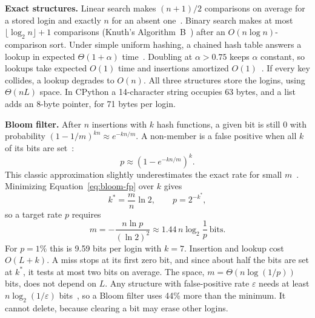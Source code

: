 \documentclass[acmsmall,nonacm]{acmart}
\begin{document}
\textbf{Exact structures.} Linear search makes $(n+1)/2$ comparisons on average
for a stored login and exactly $n$ for an absent one~\cite{knuth1998}. Binary
search makes at most $\lfloor \log_2 n \rfloor + 1$ comparisons (Knuth's
Algorithm~B~\cite{knuth1998}) after an $O(n \log n)$-comparison sort. Under
simple uniform hashing, a chained hash table answers a lookup in expected
$\Theta(1 + \alpha)$ time~\cite[Thms.~11.1--11.2]{cormen2022}. Doubling at
$\alpha > 0.75$ keeps $\alpha$ constant, so lookups take expected $O(1)$ time
and insertions amortized $O(1)$~\cite[\S 16.4]{cormen2022}. If every key
collides, a lookup degrades to $O(n)$. All three structures store the logins,
using $\Theta(nL)$ space. In CPython a 14-character string occupies 63 bytes,
and a list adds an 8-byte pointer, for 71 bytes per login.

\textbf{Bloom filter.} After $n$ insertions with $k$ hash functions, a given bit
is still 0 with probability $(1 - 1/m)^{kn} \approx e^{-kn/m}$. A non-member is
a false positive when all $k$ of its bits are set~\cite{broder2004,mitzenmacher2017}:
\begin{equation}
  p \approx \left(1 - e^{-kn/m}\right)^{k}.
  \label{eq:bloom-fp}
\end{equation}
This classic approximation slightly underestimates the exact rate for small
$m$~\cite{bose2008}. Minimizing Equation~\eqref{eq:bloom-fp} over $k$ gives
\begin{equation}
  k^{*} = \frac{m}{n}\ln 2, \qquad p = 2^{-k^{*}},
  \label{eq:bloom-k}
\end{equation}
so a target rate $p$ requires
\begin{equation}
  m = -\frac{n \ln p}{(\ln 2)^2} \approx 1.44\, n \log_2 \frac{1}{p}\ \text{bits.}
  \label{eq:bloom-m}
\end{equation}
For $p = 1\%$ this is 9.59 bits per login with $k = 7$. Insertion and lookup cost
$O(L + k)$. A miss stops at its first zero bit, and since about half the bits
are set at $k^{*}$, it tests at most two bits on average. The space,
$m = \Theta(n \log(1/p))$ bits, does not depend on $L$. Any structure with
false-positive rate $\varepsilon$ needs at least $n \log_2(1/\varepsilon)$
bits~\cite{carter1978}, so a Bloom filter uses 44\% more than the minimum. It
cannot delete, because clearing a bit may erase other logins.
\end{document}
